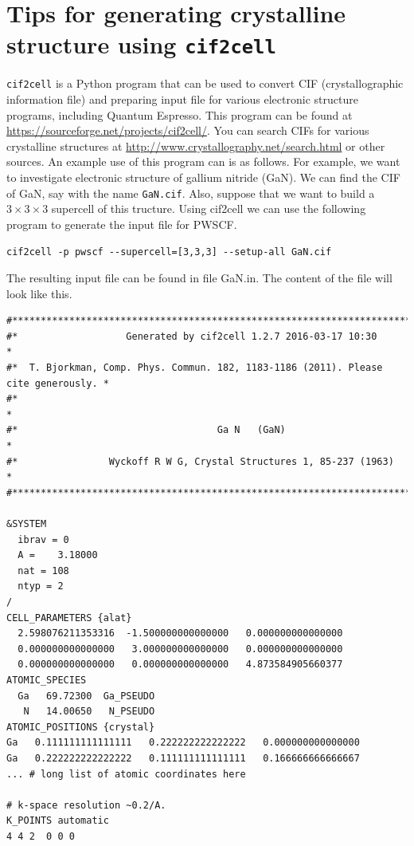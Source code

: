 \documentclass[12pt,english]{paper}
\begin{document}
\section{Tips for generating crystalline structure using \texttt{cif2cell}}

\texttt{cif2cell} is a Python program that can be used to convert
CIF (crystallographic information file) and preparing input file for
various electronic structure programs, including Quantum Espresso.
This program can be found at \url{https://sourceforge.net/projects/cif2cell/}.
You can search CIFs for various crystalline structures at \url{http://www.crystallography.net/search.html}
or other sources. An example use of this program can is as follows.
For example, we want to investigate electronic structure of gallium
nitride (GaN). We can find the CIF of GaN, say with the name \texttt{GaN.cif}.
Also, suppose that we want to build a $3\times3\times3$ supercell
of this tructure. Using cif2cell we can use the following program
to generate the input file for PWSCF.

\begin{lstlisting}
cif2cell -p pwscf --supercell=[3,3,3] --setup-all GaN.cif
\end{lstlisting}


The resulting input file can be found in file GaN.in. The content
of the file will look like this.

\begin{lstlisting}[basicstyle={\scriptsize\ttfamily}]
#************************************************************************************
#*                   Generated by cif2cell 1.2.7 2016-03-17 10:30                   *
#*  T. Bjorkman, Comp. Phys. Commun. 182, 1183-1186 (2011). Please cite generously. *
#*                                                                                  *
#*                                   Ga N   (GaN)                                   *
#*                Wyckoff R W G, Crystal Structures 1, 85-237 (1963)                *
#************************************************************************************

&SYSTEM
  ibrav = 0
  A =    3.18000
  nat = 108
  ntyp = 2
/
CELL_PARAMETERS {alat}
  2.598076211353316  -1.500000000000000   0.000000000000000
  0.000000000000000   3.000000000000000   0.000000000000000
  0.000000000000000   0.000000000000000   4.873584905660377
ATOMIC_SPECIES
  Ga   69.72300  Ga_PSEUDO
   N   14.00650   N_PSEUDO
ATOMIC_POSITIONS {crystal}
Ga   0.111111111111111   0.222222222222222   0.000000000000000
Ga   0.222222222222222   0.111111111111111   0.166666666666667
... # long list of atomic coordinates here

# k-space resolution ~0.2/A.
K_POINTS automatic
4 4 2  0 0 0
\end{lstlisting}
\end{document}
